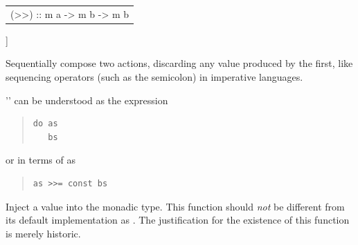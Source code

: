 \begin{haddockdesc}
{\begin{haddockdesc}
\begin{tabular}{@{}l}
(>>) :: m a -> m b -> m b
\end{tabular}]
{\haddockbegindoc
Sequentially compose two actions, discarding any value produced
 by the first, like sequencing operators (such as the semicolon)
 in imperative languages.\par
'' can be understood as the  expression\par
\begin{quote}
{\haddockverb\begin{verbatim}
do as
   bs
\end{verbatim}}
\end{quote}
or in terms of \haddocktt{\haddockid{(>>=)}} as\par
\begin{quote}
{\haddockverb\begin{verbatim}
as >>= const bs\end{verbatim}}
\end{quote}}
\end{haddockdesc}
\begin{haddockdesc}
\item[\begin{tabular}{@{}l}
return :: a -> m a
\end{tabular}]
{\haddockbegindoc
Inject a value into the monadic type.
 This function should \emph{not} be different from its default implementation
 as . The justification for the existence of this function is
 merely historic.\par}
\end{haddockdesc}}
\end{haddockdesc}
\begin{haddockdesc}
\item[\begin{tabular}{@{}l}
instance Monad Complex\\instance Monad IO\\instance Monad Maybe\\instance Monad {[}{]}\\instance Monad -> r
\end{tabular}]
\end{haddockdesc}

